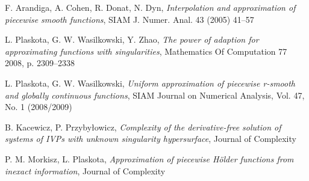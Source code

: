 \documentclass[oik, pdftex, robocza, man]{mgrwms}
\begin{document}
%  
\begin{thebibliography}{88}

    F. Arandiga, A. Cohen, R. Donat, N. Dyn,
    \emph{Interpolation and approximation of piecewise smooth functions}, SIAM J. Numer. Anal. 43 (2005) 41–57

    L. Plaskota, G. W. Wasilkowski, Y. Zhao, 
    \emph{The power of adaption for approximating functions with singularities}, Mathematics Of Computation 77
    2008, p. 2309–2338

    L. Plaskota, G. W. Wasilkowski, 
    \emph{Uniform approximation of piecewise r-smooth and globally continuous functions}, SIAM Journal on Numerical
    Analysis, Vol. 47, No. 1 (2008/2009)

    B. Kacewicz, P. Przybyłowicz, 
    \emph{Complexity of the derivative-free solution of
    systems of IVPs with unknown singularity hypersurface}, Journal of Complexity
    
    P. M. Morkisz, L. Plaskota, 
    \emph{Approximation of piecewise Hölder functions from inexact information}, Journal of Complexity

\end{thebibliography}
\end{document}
